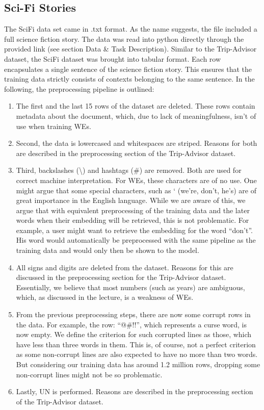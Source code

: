\documentclass[fleqn,10pt]{SelfArx} %
\begin{document}
\subsection{Sci-Fi Stories}
The SciFi data set came in .txt format. As the name suggests, the file included a full science fiction story. The data was read into python directly through the provided link (see section Data & Task Description). Similar to the Trip-Advisor dataset, the SciFi dataset was brought into tabular format. Each row encapsulates a single sentence of the science fiction story. This ensures that the training data strictly consists of contexts belonging to the same sentence. In the following, the preprocessing pipeline is outlined:

\begin{enumerate}[noitemsep]
    \item The first and the last 15 rows of the dataset are deleted. These rows contain metadata about the document, which, due to lack of meaningfulness, isn’t of use when training WEs.
    \item Second, the data is lowercased and whitespaces are striped. Reasons for both are described in the preprocessing section of the Trip-Advisor dataset.
    \item Third, backslashes (\textbackslash) and hashtags (\#) are removed. Both are used for correct machine interpretation. For WEs, these characters are of no use. One might argue that some special characters, such as ‘ (we’re, don’t, he’s) are of great importance in the English language. While we are aware of this, we argue that with equivalent preprocessing of the training data and the later words when their embedding will be retrieved, this is not problematic. For example, a user might want to retrieve the embedding for the word “don’t”. His word would automatically be preprocessed with the same pipeline as the training data and would only then be shown to the model.
    \item All signs and digits are deleted from the dataset. Reasons for this are discussed in the preprocessing section for the Trip-Advisor dataset. Essentially, we believe that most numbers (such as years) are ambiguous, which, as discussed in the lecture, is a weakness of WEs.
    \item From the previous preprocessing steps, there are now some corrupt rows in the data. For example, the row: “@#!!”, which represents a curse word, is now empty. We define the criterion for such corrupted lines as those, which have less than three words in them. This is, of course, not a perfect criterion as some non-corrupt lines are also expected to have no more than two words. But considering our training data has around 1.2 million rows, dropping some non-corrupt lines might not be so problematic. 
    \item Lastly, UN is performed. Reasons are described in the preprocessing section of the Trip-Advisor dataset.
\end{enumerate}
\end{document}
